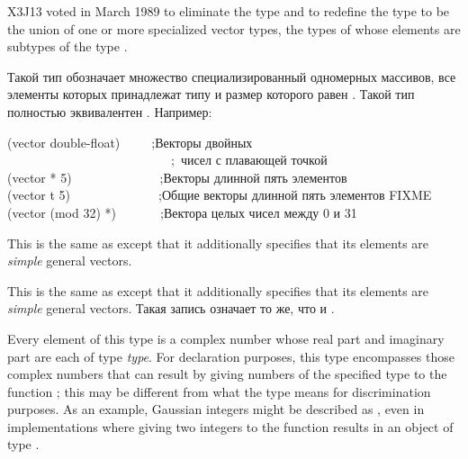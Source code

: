 \begin{flushdesc}
\begin{newer}
X3J13 voted in March 1989 
to eliminate the type  and to redefine the type
 to be the union of one or more specialized vector
types, the types of whose elements are subtypes of the type .
\end{newer}

\item[\cd{(vector \emph{тип-элемента} \emph{размер})}]
Такой тип обозначает множество специализированный одномерных массивов, все элементы
которых принадлежат типу  и размер которого равен
. Такой тип полностью эквивалентен .
Например:
\begin{lisp}
(vector double-float)~~~~~;\textrm{Векторы двойных } \\
~~~~~~~~~~~~~~~~~~~~~~~~~~;~\textrm{чисел с плавающей точкой} \\
(vector * 5)~~~~~~~~~~~~~~;\textrm{Векторы длинной пять элементов} \\
(vector t 5)~~~~~~~~~~~~~~;\textrm{Общие векторы длинной пять элементов FIXME} \\
(vector (mod 32) *)~~~~~~~;\textrm{Вектора целых чисел между 0 и 31}
\end{lisp}

\item[\cd{(simple-vector \emph{size})}]
This is the same
as  except that it additionally specifies
that its elements are \emph{simple} general vectors.

\item[\cd{(simple-vector \emph{размер})}]
This is the same
as  except that it additionally specifies
that its elements are \emph{simple} general vectors.
Такая запись означает то же, что и .

\item[\cd{(complex \emph{type})}]
Every element of this type is a
complex number whose real part
and imaginary part are each of type \emph{type}.
For declaration purposes, this type encompasses those complex numbers
that can result by giving numbers of the specified type
to the function ; this may be different
from what the type means for discrimination purposes.
As an example, Gaussian integers might be
described as , even in implementations
where giving two integers to the function  results
in an object of type .


\end{flushdesc}
